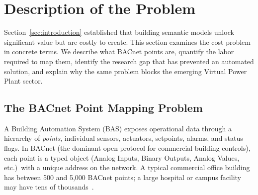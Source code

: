 %

\section{Description of the Problem}
\label{sec:problem}

Section~\ref{sec:introduction} established that building semantic models unlock significant value
but are costly to create.
This section examines the cost problem in concrete terms.
We describe what BACnet points are, quantify the labor required to map them, identify the research
gap that has prevented an automated solution, and explain why the same problem blocks the emerging
Virtual Power Plant sector.

\subsection{The BACnet Point Mapping Problem}
\label{subsec:bacnet-problem}

A Building Automation System (BAS) exposes operational data through a hierarchy of \emph{points}, 
individual sensors, actuators, setpoints, alarms, and status flags.
In BACnet (the dominant open protocol for commercial building controls), each point is a typed object
(Analog Inputs, Binary Outputs, Analog Values, etc.)\ with a unique address on the network.
A typical commercial office building has between 500 and 5{,}000 BACnet points; a large hospital or
campus facility may have tens of thousands~\cite{Trenbath2022}.

